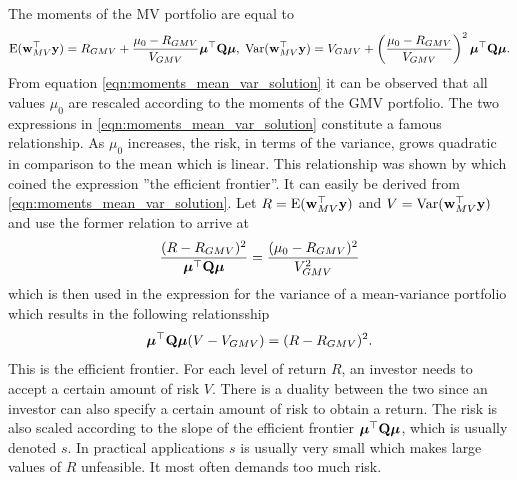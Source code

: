 \documentclass[12pt, oneside]{book}\usepackage{knitr}
\begin{document}
The moments of the MV portfolio are equal to
\begin{equation}\label{eqn:moments_mean_var_solution}
\operatorname{E}(\mathbf{w}_{MV}^\top\mathbf{y}) = R_{GMV} + \frac{\mu_0 - R_{GMV}}{V_{GMV}} \mbox{\boldmath$\mu$}^\top \mathbf{Q} \mbox{\boldmath$\mu$}, \;
\operatorname{Var}(\mathbf{w}_{MV}^\top\mathbf{y}) =V_{GMV} + \left(\frac{\mu_0 - R_{GMV}}{V_{GMV}}\right)^2 \mbox{\boldmath$\mu$}^\top \mathbf{Q} \mbox{\boldmath$\mu$}.
\end{equation}
From equation \eqref{eqn:moments_mean_var_solution} it can be observed that all values $\mu_0$ are rescaled according to the moments of the GMV portfolio. 
The two expressions in \eqref{eqn:moments_mean_var_solution} constitute a famous relationship. 
As $\mu_0$ increases, the risk, in terms of the variance, grows quadratic in comparison to the mean which is linear. 
This relationship was shown by \citet{merton1972} which coined the expression ''the efficient frontier''.
It can easily be derived from \eqref{eqn:moments_mean_var_solution}.
Let $R =\operatorname{E}(\mathbf{w}_{MV}^\top\mathbf{y})$ and $V=\operatorname{Var}(\mathbf{w}_{MV}^\top\mathbf{y})$ and use the former relation to arrive at 
$$
\frac{(R-R_{GMV})^2}{\mbox{\boldmath$\mu$}^\top \mathbf{Q} \mbox{\boldmath$\mu$}} = \frac{(\mu_0 - R_{GMV})^2}{V_{GMV}^2}
$$
which is then used in the expression for the variance of a mean-variance portfolio which results in the following relationsship
\begin{equation}\label{eqn:efficient_frontier}
\mbox{\boldmath$\mu$}^\top \mathbf{Q} \mbox{\boldmath$\mu$} (V - V_{GMV}) = (R - R_{GMV})^2.
\end{equation}
This is the efficient frontier.
For each level of return $R$, an investor needs to accept a certain amount of risk $V$.
There is a duality between the two since an investor can also specify a certain amount of risk to obtain a return.
The risk is also scaled according to the slope of the efficient frontier $\mbox{\boldmath$\mu$}^\top \mathbf{Q} \mbox{\boldmath$\mu$}$, which is usually denoted $s$.
In practical applications $s$ is usually very small which makes large values of $R$ unfeasible.
It most often demands too much risk.
\end{document}

